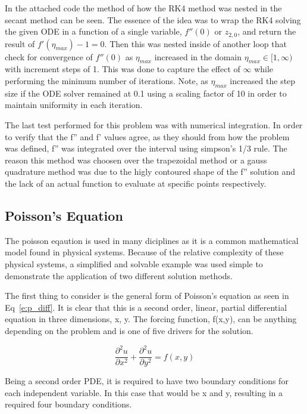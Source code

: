 \documentclass[]{aiaa-tc}%
\begin{document}
In the attached code the method of how the RK4 method was nested in the secant
method can be seen. The essence of the idea was to wrap the RK4 solving the given
ODE in a function of a single variable, $f''(0)$ or $z_{2,0}$, and return the result of $f'(\eta_{max}) - 1 = 0$.
Then this was nested inside of another loop that check for convergence of $f''(0)$
as $\eta_{max}$ increased in the domain $\eta_{max} \in [1,\infty)$ with increment
steps of 1. This was done to capture the effect of $\infty$ while performing the
minimum number of iterations. Note, as $\eta_{max}$ increased the step size if the
ODE solver remained at 0.1 using a scaling factor of 10 in order to maintain uniformity
in each iteration.

The last test performed for this problem was with numerical integration. In order
to verify that the f'' and f' values agree, as they should from how the problem was
defined, f'' was integrated over the interval using simpson's 1/3 rule. The reason
this method was choosen over the trapezoidal method or a gauss quadrature method
was due to the higly contoured shape of the f'' solution and the lack of an actual
function to evaluate at specific points respectively. 

\FloatBarrier\subsection{Poisson's Equation}

The poisson eqaution is used in many diciplines as it is a common mathematical
model found in physical systems. Because of the relative complexity of these
physical systems, a simplified and solvable example was used simple to demonstrate
the application of two different solution methods.

The first thing to consider is the general form of Poisson's equation as seen in
Eq~\ref{e:p_diff}. It is clear that this is a second order, linear, partial differential
equation in three dimensions, x, y. The forcing function, f(x,y), can be anything
depending on the problem and is one of five drivers for the solution.

\begin{equation}
  \label{e:p_diff}
  \frac{\partial ^2 u}{\partial x^2} + \frac{\partial ^2 u}{\partial y^2} = f(x,y)
\end{equation}

Being a second order PDE, it is required to have two boundary conditions for each
independent variable. In this case that would be x and y, resulting in a required
four boundary conditions.
\end{document}
